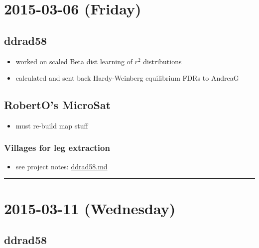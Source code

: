 \documentclass[letterpaper]{scrartcl}
\begin{document}
\section{2015-03-06 (Friday)}\label{friday}

\subsection{ddrad58}\label{ddrad58}

\begin{itemize}
\itemsep1pt\parskip0pt
\item
  worked on scaled Beta dist learning of \(r^2\) distributions
\item
  calculated and sent back Hardy-Weinberg equilibrium FDRs to AndreaG
\end{itemize}

\subsection{RobertO's MicroSat}\label{robertos-microsat}

\begin{itemize}
\itemsep1pt\parskip0pt
\item
  must re-build map stuff
\end{itemize}

\subsubsection{Villages for leg
extraction}\label{villages-for-leg-extraction}

\begin{itemize}
\itemsep1pt\parskip0pt
\item
  see project notes:
  \href{file:///home/gus/Dropbox/repos/git/markdown-docs/notes/projects/ddrad58/ddrad58.md}{ddrad58.md}
\end{itemize}

\begin{center}\rule{0.5\linewidth}{\linethickness}\end{center}

\section{2015-03-11 (Wednesday)}\label{wednesday-1}

\subsection{ddrad58}\label{ddrad58-1}
\end{document}

